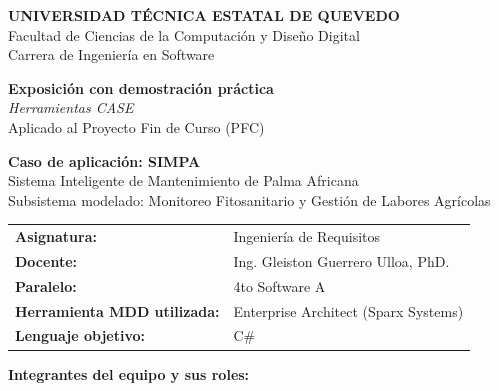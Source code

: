 \documentclass[11pt,a4paper]{article}
\begin{document}
	
	\begin{titlepage}
		\centering
		\vspace*{0.5cm}
		
		
		{\large \textbf{UNIVERSIDAD TÉCNICA ESTATAL DE QUEVEDO}}\\
		\vspace{0.15cm}
		{\normalsize Facultad de Ciencias de la Computación y Diseño Digital}\\
		{\normalsize Carrera de Ingeniería en Software}
		
		
		
		\vspace{1.5cm}
		{\Large \textbf{Exposición con demostración práctica}}\\[0.3cm]
		{\large \textit{Herramientas CASE}}\\[0.2cm]
		{\normalsize Aplicado al Proyecto Fin de Curso (PFC)}
		
		\vspace{1.2cm}
		{\Large \textbf{Caso de aplicación: SIMPA}}\\[0.15cm]
		{\normalsize Sistema Inteligente de Mantenimiento de Palma Africana}\\[0.15cm]
		{\normalsize Subsistema modelado: Monitoreo Fitosanitario y Gestión de Labores Agrícolas}
		
		\vspace{1.5cm}
		\begin{tabular}{ll}
			\textbf{Asignatura:} & Ingeniería de Requisitos \\
			\textbf{Docente:} & Ing. Gleiston Guerrero Ulloa, PhD. \\
			\textbf{Paralelo:} &  4to Software A \\
			\textbf{Herramienta MDD utilizada:} & Enterprise Architect (Sparx Systems) \\
			\textbf{Lenguaje objetivo:} & C\#  \\
		\end{tabular}
		
		\vspace{1.2cm}
		
		
		\begin{center}
			\centering
			\renewcommand{\arraystretch}{1.2}
			{\normalsize \textbf{Integrantes del equipo y sus roles:}}\\
			\vspace{0.5cm}
			\label{tab:integrantes}
			
			\begin{tabularx}{\textwidth}{lXX}
				\toprule
				

\end{tabularx}
\end{center}
\end{titlepage}
\end{document}
